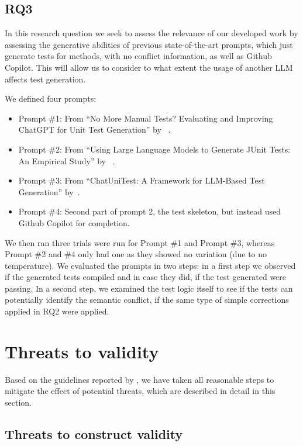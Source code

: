 \subsection{RQ3}

In this research question we seek to assess the relevance of our developed work by assessing the generative abilities of previous state-of-the-art prompts, which just generate tests for methods, with no conflict information, as well as Github Copilot. This will allow us to consider to what extent the usage of another LLM affects test generation.

We defined four prompts:
\begin{itemize}
  \item Prompt \#1: From ``No More Manual Tests? Evaluating and Improving ChatGPT for Unit Test Generation'' by ~\citet{kn:chattester}.
  \item Prompt \#2: From ``Using Large Language Models to Generate JUnit Tests: An Empirical Study'' by ~\citet{kn:siddiq2023empirical}.
  \item Prompt \#3: From ``ChatUniTest: A Framework for LLM-Based Test Generation'' by~\citet{kn:chatunitest}.
  \item Prompt \#4: Second part of prompt 2, the test skeleton, but instead used Github Copilot for completion.
\end{itemize}
%
We then ran three trials were run for Prompt \#1 and Prompt \#3, whereas Prompt \#2 and \#4 only had one as they showed no variation (due to no temperature).
We evaluated the prompts in two steps: in a first step we observed if the generated tests compiled and in case they did, if the test generated were passing.
In a second step, we examined the test logic itself to see if the tests can potentially identify the semantic conflict, if the same type of simple corrections applied in RQ2 were applied.

\section{Threats to validity}


Based on the guidelines reported by \citet{wohlin2012experimentation}, we have
taken all reasonable steps to mitigate the effect of potential threats, which
are described in detail in this section.

\subsection{Threats to construct validity}

